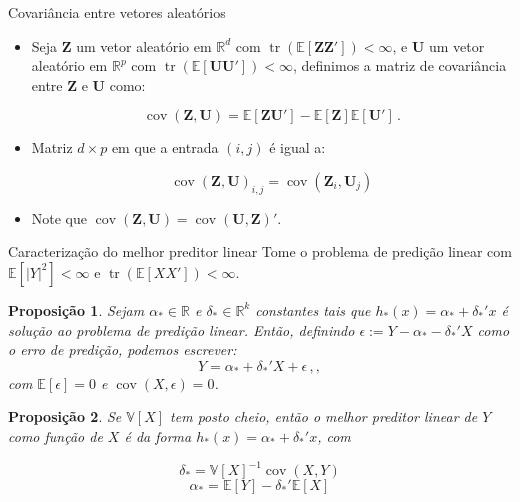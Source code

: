 \documentclass[11pt]{beamer}
\newtheorem{proposition}{Proposição}
\begin{document}
\begin{frame}{Covariância entre vetores aleatórios}
\begin{itemize}
	 		\item Seja $\boldsymbol{Z}$ um vetor aleatório em $\mathbb{R}^d$ com $\operatorname{tr}(\mathbb{E}[\boldsymbol{Z}\boldsymbol{Z}'])<\infty$, e $\boldsymbol{U}$ um vetor aleatório em $\mathbb{R}^p$ com $\operatorname{tr}(\mathbb{E}[\boldsymbol{U}\boldsymbol{U}'])<\infty$, definimos a matriz de covariância entre $\mathbf{Z}$ e $\boldsymbol{U}$  como:
	
	$$\operatorname{cov}(\boldsymbol{Z},\boldsymbol{U}) = \mathbb{E}[\boldsymbol{Z}\boldsymbol{U}'] - \mathbb{E}[\boldsymbol{Z}]\mathbb{E}[\boldsymbol{U}'] \, .$$
	\item Matriz $d \times p$ em que a entrada $(i,j)$ é igual a:
	
	$$\operatorname{cov}(\boldsymbol{Z},\boldsymbol{U})_{i,j} = \operatorname{cov}(\boldsymbol{Z}_i,\boldsymbol{U}_j)$$
	\item Note que $\operatorname{cov}(\boldsymbol{Z},\boldsymbol{U}) = \operatorname{cov}(\boldsymbol{U},\boldsymbol{Z})'$.
\end{itemize}
\end{frame}
\begin{frame}{Caracterização do melhor preditor linear}
	Tome o problema de predição linear com $\mathbb{E}[|Y|^2]<\infty$ e $\operatorname{tr}(\mathbb{E}[XX'])<\infty$. 
	\begin{proposition}
		Sejam $\alpha_* \in \mathbb{R}$ e $\delta_* \in \mathbb{R}^k$ constantes tais que $h_*(x) = \alpha_* + \delta_*'x$ é solução ao problema de predição linear. Então, definindo $\epsilon := Y - \alpha_* - \delta_*'X$ como o erro de predição, podemos escrever:
		$$Y = \alpha_* + \delta_*' X + \epsilon\,, ,$$
		com $\mathbb{E}[\epsilon] = 0$ e $\operatorname{cov}(X,\epsilon)=0$.
	\end{proposition}
\begin{proposition}
Se $\mathbb{V}[X]$ tem posto cheio, então o melhor preditor linear de $Y$ como função de $X$ é da forma $h_*(x) = \alpha_* + \delta_*' x$, com

$$\delta_* = \mathbb{V}[X]^{-1} \operatorname{cov}(X,Y)$$
$$\alpha_* = \mathbb{E}[Y] - \delta_*'\mathbb{E}[X]$$

\end{proposition}
\end{frame}
\end{document}
